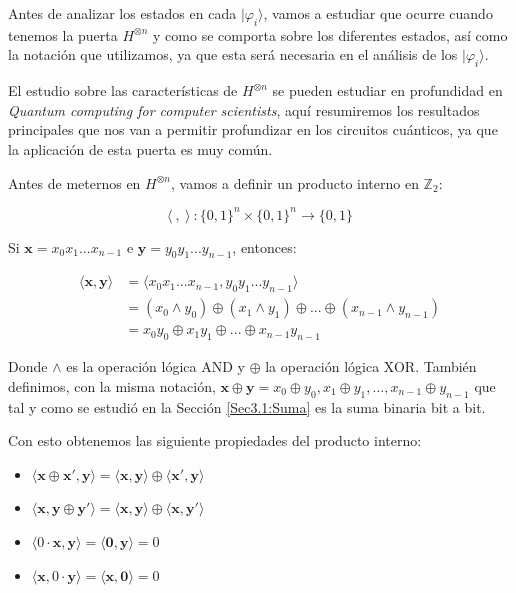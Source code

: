  Antes de analizar los estados en cada $|\varphi_{i}\rangle$, vamos a estudiar que ocurre cuando tenemos la puerta $H^{\otimes n}$ y como se comporta sobre los diferentes estados, así como la notación que utilizamos, ya que esta será necesaria en el análisis de los $|\varphi_{i}\rangle$. \newline

 El estudio sobre las características de $H^{\otimes n}$ se pueden estudiar en profundidad en \textit{Quantum computing for computer scientists}\cite{B:QuantumScientist:2008}, aquí resumiremos los resultados principales que nos van a permitir profundizar en los circuitos cuánticos, ya que la aplicación de esta puerta es muy común.\newline

 Antes de meternos en $H^{\otimes n}$, vamos a definir un producto interno en $\mathbb{Z}_{2}$:

 \begin{equation*}
     \langle\:,\:\rangle\::\{0,1\}^{n} \times \{0,1\}^{n} \rightarrow \{0,1\}\end{equation*}

 Si $\mathbf{x}=x_{0}x_{1}...x_{n-1}$ e $\mathbf{y}=y_{0}y_{1}...y_{n-1}$, entonces:

 \begin{equation}
     \begin{split}
     \langle\mathbf{x},\mathbf{y}\rangle &= \langle x_{0}x_{1}...x_{n-1},y_{0}y_{1}...y_{n-1}\rangle \\ &= (x_{0}\land y_{0})\oplus(x_{1}\land y_{1})\oplus...\oplus(x_{n-1}\land y_{n-1}) \\ &= x_{0}y_{0}\oplus x_{1}y_{1}\oplus ... \oplus x_{n-1}y_{n-1}
     \end{split}
 \end{equation}

 Donde $\land$ es la operación lógica AND y $\oplus$ la operación lógica XOR. También definimos, con la misma notación,  $\mathbf{x}\oplus\mathbf{y}=x_{0}\oplus y_{0},x_{1}\oplus y_{1},...,x_{n-1}\oplus y_{n-1}$ que tal y como se estudió en la Sección \ref{Sec3.1:Suma} es la suma binaria bit a bit.\newline

 Con esto obtenemos las siguiente propiedades del producto interno:

 \begin{itemize}
     \item $\langle \mathbf{x} \oplus \mathbf{x}',\mathbf{y}\rangle=\langle \mathbf{x},\mathbf{y}\rangle \oplus \langle \mathbf{x}',\mathbf{y}\rangle$

     \item $\langle \mathbf{x},\mathbf{y} \oplus \mathbf{y}'\rangle=\langle \mathbf{x},\mathbf{y}\rangle \oplus \langle \mathbf{x},\mathbf{y}'\rangle$

     \item $\langle 0\cdot \mathbf{x},\mathbf{y}\rangle=\langle\mathbf{0},\mathbf{y}\rangle=0$

     \item $\langle \mathbf{x}, 0 \cdot \mathbf{y}\rangle=\langle \mathbf{x},\mathbf{0}\rangle=0$
 \end{itemize}

